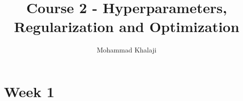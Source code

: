 \documentclass[10pt,a4paper]{article}
\author{Mohammad Khalaji}
\title{Course 2 - Hyperparameters, Regularization and Optimization}
\begin{document}
\maketitle
\section{Week 1}

% 
% 
\end{document}
